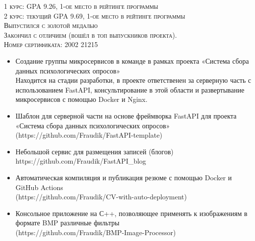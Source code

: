 \documentclass[10pt,a4paper]{altacv}
\begin{document}
\tagline{}

\begin{fullwidth}
\makecvheader
\end{fullwidth}


\textsc{1 курс: GPA 9.26, 1-ое место в рейтинге программы} \\
\textsc{2 курс: текущий GPA 9.69, 1-ое место в рейтинге программы}
\\
\vspace{10pt}
\textsc{Выпустился с золотой медалью}
\\
\vspace{10pt}
\textsc{Закончил с отличием (вошёл в топ выпускников проекта). \\ Номер сертификата: 2002 21215}


\begin{itemize}
\item Создание группы микросервисов в команде в рамках проекта «Система сбора данных психологических опросов» \\
Находится на стадии разработки, в проекте ответственен за серверную часть с использованием FastAPI, консультирование в этой области и развертывание микросервисов с помощью Docker и Nginx. \\
\item Шаблон для серверной части на основе фреймворка FastAPI для проекта «Система сбора данных психологических опросов» \\
(https://github.com/Fraudik/FastAPI-template) \\
\item Небольшой сервис для размещения записей (блогов)
https://github.com/Fraudik/FastAPI\_blog \\
\item Автоматическая компиляция и публикация резюме с помощью Docker и GitHub Actions \\
(https://github.com/Fraudik/CV-with-auto-deployment) \\
\item  Консольное приложение на С++, позволяющее применять к изображениям в формате BMP различные фильтры \\
(https://github.com/Fraudik/BMP-Image-Processor) \\
\end{itemize}
\end{document}

